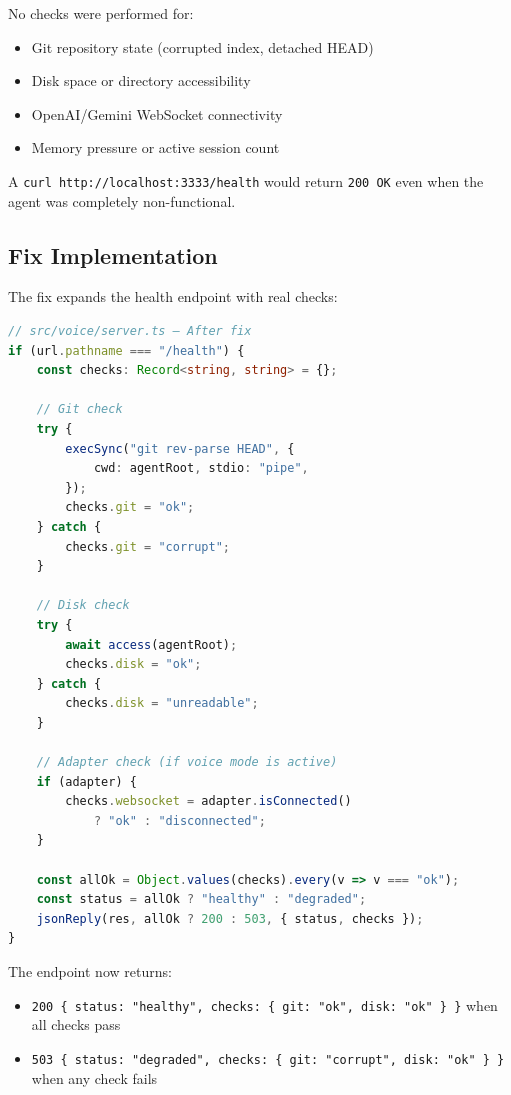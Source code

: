 No checks were performed for:
\begin{itemize}
    \item Git repository state (corrupted index, detached HEAD)
    \item Disk space or directory accessibility
    \item OpenAI/Gemini WebSocket connectivity
    \item Memory pressure or active session count
\end{itemize}

A \texttt{curl http://localhost:3333/health} would return \texttt{200 OK} even when the agent was completely non-functional.

\subsection*{Fix Implementation}

The fix expands the health endpoint with real checks:

\begin{lstlisting}[language=TypeScript]
// src/voice/server.ts — After fix
if (url.pathname === "/health") {
    const checks: Record<string, string> = {};

    // Git check
    try {
        execSync("git rev-parse HEAD", {
            cwd: agentRoot, stdio: "pipe",
        });
        checks.git = "ok";
    } catch {
        checks.git = "corrupt";
    }

    // Disk check
    try {
        await access(agentRoot);
        checks.disk = "ok";
    } catch {
        checks.disk = "unreadable";
    }

    // Adapter check (if voice mode is active)
    if (adapter) {
        checks.websocket = adapter.isConnected()
            ? "ok" : "disconnected";
    }

    const allOk = Object.values(checks).every(v => v === "ok");
    const status = allOk ? "healthy" : "degraded";
    jsonReply(res, allOk ? 200 : 503, { status, checks });
}
\end{lstlisting}

The endpoint now returns:
\begin{itemize}
    \item \texttt{200 \{ status: "healthy", checks: \{ git: "ok", disk: "ok" \} \}} when all checks pass
    \item \texttt{503 \{ status: "degraded", checks: \{ git: "corrupt", disk: "ok" \} \}} when any check fails
\end{itemize}

